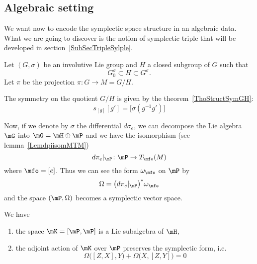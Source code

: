 \subsection{Algebraic setting}

We want now to encode the symplectic space structure in an algebraic data. What we are going to discover is the notion of symplectic triple that will be developed in section~\ref{SubSecTripleSylple}.

Let $(G,\sigma)$ be an involutive Lie group and $H$ a closed subgroup of $G$ such that
\begin{equation}
	G_0^{\sigma}\subset H\subset G^{\sigma}.
\end{equation}
Let $\pi$ be the projection $\pi\colon G\to M=G/H$.

The symmetry on the quotient $G/H$ is given by the theorem~\ref{ThoStructSymGH}:
\begin{equation}		\label{EaSymGH}
	s_{[g]}[g']=\big[ \sigma(g^{-1}g') \big]
\end{equation}

Now, if we denote by $\sigma$ the differential $d\sigma_e$, we can decompose the Lie algebra $\mG$ into $\mG=\mH\oplus\mP$ and we have the isomorphism (see lemma~\ref{LemdpiisomMTM})
\begin{equation}
	d\pi_e|_{\mP}\colon \mP\to T_{\mfo}(M)
\end{equation}
where $\mfo=[e]$. Thus we can see the form $\omega_{\mfo}$ on $\mP$ by
\begin{equation}
	\Omega=\big( d\pi_e|_{\mP} \big)^*\omega_{\mfo}
\end{equation}
and the space $(\mP,\Omega)$ becomes a symplectic vector space.

\begin{lemma}
	We have
	\begin{enumerate}

		\item
		      the space $\mK=[\mP,\mP]$ is a Lie subalgebra of $\mH$,

		\item
		      the adjoint action of $\mK$ over $\mP$ preserves the symplectic form, i.e.
		      \begin{equation}
			      \Omega\big( [Z,X],Y \big)+\Omega\big( X,[Z,Y] \big)=0
		      \end{equation}

	\end{enumerate}

\end{lemma}

